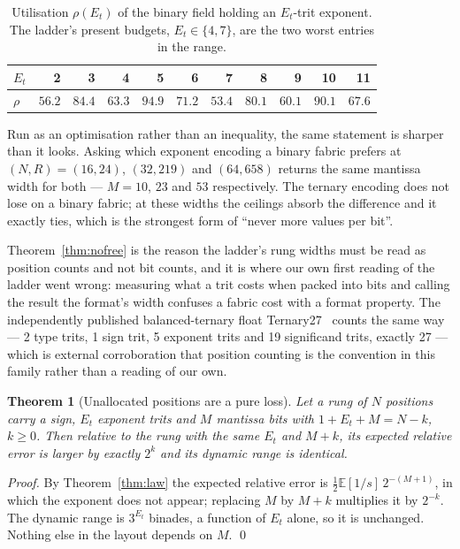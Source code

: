\documentclass[11pt]{article}
\newtheorem{theorem}{Theorem}
\theoremstyle{definition}
\begin{document}
\begin{table}[t]\centering
\caption{Utilisation $\rho(E_t)$ of the binary field holding an $E_t$-trit
exponent. The ladder's present budgets, $E_t \in \{4, 7\}$, are the two worst
entries in the range.}
\label{tab:rho}
\begin{tabular}{lrrrrrrrrrr}
\toprule
$E_t$ & 2 & 3 & 4 & 5 & 6 & 7 & 8 & 9 & 10 & 11 \\
\midrule
$\rho$ & $56.2$ & $84.4$ & $\mathbf{63.3}$ & $94.9$ & $71.2$ & $\mathbf{53.4}$ & $80.1$ & $60.1$ & $90.1$ & $67.6$ \\
\bottomrule
\end{tabular}
\end{table}

Run as an optimisation rather than an inequality, the same statement is sharper
than it looks. Asking which exponent encoding a binary fabric prefers at
$(N, R) = (16, 24)$, $(32, 219)$ and $(64, 658)$ returns the same mantissa width
for both --- $M = 10$, $23$ and $53$ respectively. The ternary encoding does not
lose on a binary fabric; at these widths the ceilings absorb the difference and it
exactly ties, which is the strongest form of ``never more values per bit''.

Theorem~\ref{thm:nofree} is the reason the ladder's rung widths must be read as
position counts and not bit counts, and it is where our own first reading of the
ladder went wrong: measuring what a trit costs when packed into bits and calling
the result the format's width confuses a fabric cost with a format property. The
independently published balanced-ternary float Ternary27~\cite{ternary27} counts
the same way --- 2 type trits, 1 sign trit, 5 exponent trits and 19 significand
trits, exactly 27 --- which is external corroboration that position counting is
the convention in this family rather than a reading of our own.

\begin{theorem}[Unallocated positions are a pure loss]
\label{thm:alloc}
Let a rung of $N$ positions carry a sign, $E_t$ exponent trits and $M$ mantissa
bits with $1 + E_t + M = N - k$, $k \geq 0$. Then relative to the rung with the
same $E_t$ and $M + k$, its expected relative error is larger by exactly $2^{k}$
and its dynamic range is identical.
\end{theorem}

\begin{proof}
By Theorem~\ref{thm:law} the expected relative error is
$\tfrac12 \mathbb{E}[1/s]\,2^{-(M+1)}$, in which the exponent does not appear;
replacing $M$ by $M+k$ multiplies it by $2^{-k}$. The dynamic range is
$3^{E_t}$ binades, a function of $E_t$ alone, so it is unchanged. Nothing else in
the layout depends on $M$. \qed
\end{proof}
\end{document}
